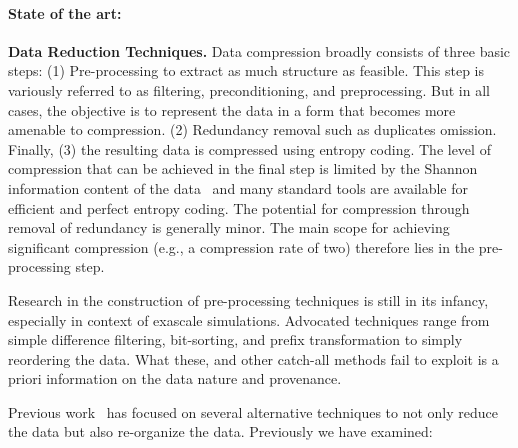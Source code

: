 \paragraph{State of the art:} {\bf Data Reduction Techniques.} Data compression
broadly consists of three basic steps: (1) Pre-processing to extract as much
structure as feasible. This step is variously referred to as filtering,
preconditioning, and preprocessing. But in all cases, the objective is to
represent the data in a form that becomes more amenable to compression.  (2)
Redundancy removal such as duplicates omission.  Finally, (3) the
resulting data is compressed using entropy coding. The level of compression
that can be achieved in the final step is limited by the Shannon information
content of the data~\cite{Gray:book} and many standard tools are available for
efficient and perfect entropy coding. The potential for compression through
removal of redundancy is generally minor. The main scope for achieving
significant compression (e.g., a compression rate of two) therefore
lies in the pre-processing step.

Research in the construction of pre-processing techniques is still in its
infancy, especially in context of exascale simulations. Advocated techniques 
range from simple difference filtering, bit-sorting, and prefix
transformation to simply reordering the data.  What these, and other
catch-all methods fail to exploit is a priori information on the data nature and
provenance. 

Previous
work~\cite{lakshminarasimhan2011compressing,%
gong2012multi,jenkins2012byte,gong2013parlo,boyuka2014transparent,%
tang2014improving, sato2014user}
has focused on several alternative techniques to not only reduce the data
but also re-organize the data. Previously we have examined:


